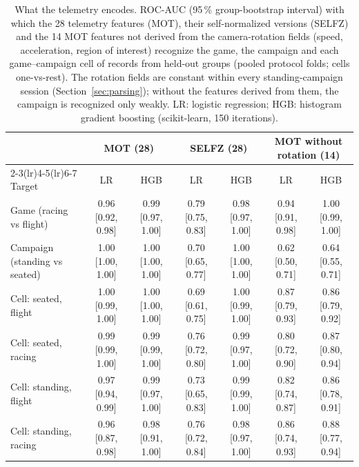 \begin{table}[t]
\centering
\footnotesize
\caption{What the telemetry encodes. ROC-AUC (95\,\% group-bootstrap interval) with which the 28 telemetry features (MOT), their self-normalized versions (SELFZ) and the 14 MOT features not derived from the camera-rotation fields (speed, acceleration, region of interest) recognize the game, the campaign and each game--campaign cell of records from held-out groups (pooled protocol folds; cells one-vs-rest). The rotation fields are constant within every standing-campaign session (Section~\ref{sec:parsing}); without the features derived from them, the campaign is recognized only weakly. LR: logistic regression; HGB: histogram gradient boosting (scikit-learn, 150 iterations).}
\label{tab:decode}
\setlength{\tabcolsep}{3pt}
\begin{tabular}{@{}lcccccc@{}}
\toprule
 & \multicolumn{2}{c}{MOT (28)} & \multicolumn{2}{c}{SELFZ (28)} & \multicolumn{2}{c}{MOT without rotation (14)} \\
\cmidrule(lr){2-3}\cmidrule(lr){4-5}\cmidrule(lr){6-7}
Target & LR & HGB & LR & HGB & LR & HGB \\
\midrule
Game (racing vs flight) & 0.96 {\scriptsize [0.92, 0.98]} & 0.99 {\scriptsize [0.97, 1.00]} & 0.79 {\scriptsize [0.75, 0.83]} & 0.98 {\scriptsize [0.97, 1.00]} & 0.94 {\scriptsize [0.91, 0.98]} & 1.00 {\scriptsize [0.99, 1.00]} \\
Campaign (standing vs seated) & 1.00 {\scriptsize [1.00, 1.00]} & 1.00 {\scriptsize [1.00, 1.00]} & 0.70 {\scriptsize [0.65, 0.77]} & 1.00 {\scriptsize [1.00, 1.00]} & 0.62 {\scriptsize [0.50, 0.71]} & 0.64 {\scriptsize [0.55, 0.71]} \\
Cell: seated, flight & 1.00 {\scriptsize [0.99, 1.00]} & 1.00 {\scriptsize [1.00, 1.00]} & 0.69 {\scriptsize [0.61, 0.75]} & 1.00 {\scriptsize [0.99, 1.00]} & 0.87 {\scriptsize [0.79, 0.93]} & 0.86 {\scriptsize [0.79, 0.92]} \\
Cell: seated, racing & 0.99 {\scriptsize [0.99, 1.00]} & 0.99 {\scriptsize [0.99, 1.00]} & 0.76 {\scriptsize [0.72, 0.80]} & 0.99 {\scriptsize [0.97, 1.00]} & 0.80 {\scriptsize [0.72, 0.90]} & 0.87 {\scriptsize [0.80, 0.94]} \\
Cell: standing, flight & 0.97 {\scriptsize [0.94, 0.99]} & 0.99 {\scriptsize [0.97, 1.00]} & 0.73 {\scriptsize [0.65, 0.83]} & 0.99 {\scriptsize [0.99, 1.00]} & 0.82 {\scriptsize [0.74, 0.87]} & 0.86 {\scriptsize [0.78, 0.91]} \\
Cell: standing, racing & 0.96 {\scriptsize [0.87, 0.98]} & 0.98 {\scriptsize [0.91, 1.00]} & 0.76 {\scriptsize [0.72, 0.84]} & 0.98 {\scriptsize [0.97, 1.00]} & 0.86 {\scriptsize [0.74, 0.93]} & 0.88 {\scriptsize [0.77, 0.94]} \\
\bottomrule
\end{tabular}
\end{table}